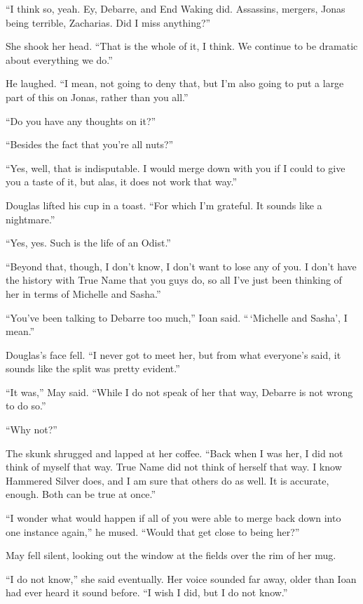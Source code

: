 ``I think so, yeah. Ey, Debarre, and End Waking did. Assassins, mergers, Jonas being terrible, Zacharias. Did I miss anything?''

She shook her head. ``That is the whole of it, I think. We continue to be dramatic about everything we do.''

He laughed. ``I mean, not going to deny that, but I'm also going to put a large part of this on Jonas, rather than you all.''

``Do you have any thoughts on it?''

``Besides the fact that you're all nuts?''

``Yes, well, that is indisputable. I would merge down with you if I could to give you a taste of it, but alas, it does not work that way.''

Douglas lifted his cup in a toast. ``For which I'm grateful. It sounds like a nightmare.''

``Yes, yes. Such is the life of an Odist.''

``Beyond that, though, I don't know, I don't want to lose any of you. I don't have the history with True Name that you guys do, so all I've just been thinking of her in terms of Michelle and Sasha.''

``You've been talking to Debarre too much,'' Ioan said. ``\,`Michelle and Sasha', I mean.''

Douglas's face fell. ``I never got to meet her, but from what everyone's said, it sounds like the split was pretty evident.''

``It was,'' May said. ``While I do not speak of her that way, Debarre is not wrong to do so.''

``Why not?''

The skunk shrugged and lapped at her coffee. ``Back when I was her, I did not think of myself that way. True Name did not think of herself that way. I know Hammered Silver does, and I am sure that others do as well. It is accurate, enough. Both can be true at once.''

``I wonder what would happen if all of you were able to merge back down into one instance again,'' he mused. ``Would that get close to being her?''

May fell silent, looking out the window at the fields over the rim of her mug.

``I do not know,'' she said eventually. Her voice sounded far away, older than Ioan had ever heard it sound before. ``I wish I did, but I do not know.''
